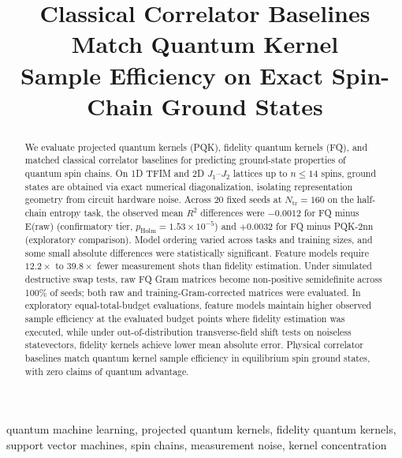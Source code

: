 \documentclass[conference]{IEEEtran}
\begin{document}
\title{Classical Correlator Baselines Match Quantum Kernel\\
Sample Efficiency on Exact Spin-Chain Ground States}

\author{
}

\maketitle

\begin{abstract}
We evaluate projected quantum kernels (PQK), fidelity quantum kernels (FQ),
and matched classical correlator baselines for predicting ground-state
properties of quantum spin chains. On 1D TFIM and 2D $J_1$--$J_2$ lattices
up to $n\le 14$ spins, ground states are obtained via exact numerical
diagonalization, isolating representation geometry from circuit hardware
noise. Across 20 fixed seeds at $N_{\mathrm{tr}}=160$ on the half-chain entropy task, the observed mean $R^2$ differences were $-0.0012$ for FQ minus E(raw) (confirmatory tier, $p_{\mathrm{Holm}} = 1.53 \times 10^{-5}$) and $+0.0032$ for FQ minus PQK-2nn (exploratory comparison). Model ordering varied across tasks and training sizes, and some small absolute differences were statistically significant. Feature models require $12.2\times$ to $39.8\times$ fewer measurement shots than fidelity estimation. Under simulated destructive swap tests, raw FQ Gram matrices
become non-positive semidefinite across 100\% of seeds; both raw and
training-Gram-corrected matrices were evaluated. In exploratory equal-total-budget
evaluations, feature models maintain higher observed sample efficiency at the
evaluated budget points where fidelity estimation was executed, while under
out-of-distribution transverse-field shift tests on noiseless statevectors,
fidelity kernels achieve lower mean absolute error. Physical correlator baselines match quantum kernel sample efficiency
in equilibrium spin ground states, with zero claims of quantum advantage.
\end{abstract}

\begin{IEEEkeywords}
quantum machine learning, projected quantum kernels, fidelity quantum kernels,
support vector machines, spin chains, measurement noise, kernel concentration
\end{IEEEkeywords}
\end{document}
